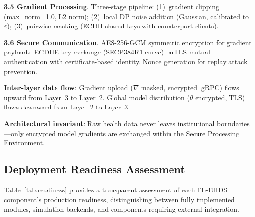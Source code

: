 \documentclass[conference]{IEEEtran}
\begin{document}
\textbf{3.5 Gradient Processing}. Three-stage pipeline: (1)~gradient clipping (max\_norm=1.0, L2 norm); (2)~local DP noise addition (Gaussian, calibrated to $\varepsilon$); (3)~pairwise masking (ECDH shared keys with counterpart clients).

\textbf{3.6 Secure Communication}. AES-256-GCM symmetric encryption for gradient payloads. ECDHE key exchange (SECP384R1 curve). mTLS mutual authentication with certificate-based identity. Nonce generation for replay attack prevention.

\textbf{Inter-layer data flow}: Gradient upload ($\nabla$ masked, encrypted, gRPC) flows upward from Layer~3 to Layer~2. Global model distribution ($\theta$ encrypted, TLS) flows downward from Layer~2 to Layer~3.

\textbf{Architectural invariant}: Raw health data never leaves institutional boundaries---only encrypted model gradients are exchanged within the Secure Processing Environment.

\subsection{Deployment Readiness Assessment}

Table~\ref{tab:readiness} provides a transparent assessment of each FL-EHDS component's production readiness, distinguishing between fully implemented modules, simulation backends, and components requiring external integration.
\end{document}
